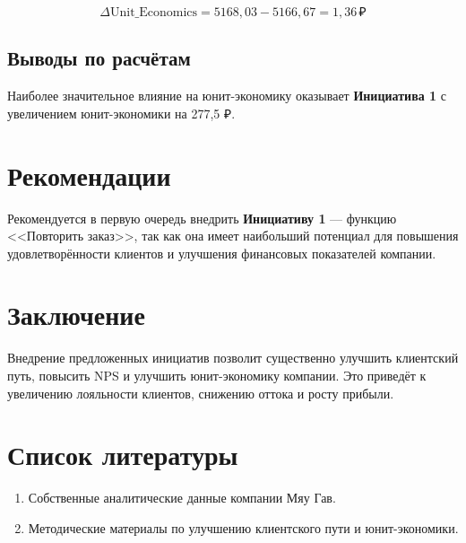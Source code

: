 \documentclass[a4paper,12pt]{article}
\begin{document}
\[
\Delta \text{Unit\_Economics} = 5168{,}03 - 5166{,}67 = 1{,}36 \, \text{₽}
\]

\subsection{Выводы по расчётам}

Наиболее значительное влияние на юнит-экономику оказывает \textbf{Инициатива 1} с увеличением юнит-экономики на 277{,}5 ₽.

\section{Рекомендации}

Рекомендуется в первую очередь внедрить \textbf{Инициативу 1} — функцию <<Повторить заказ>>, так как она имеет наибольший потенциал для повышения удовлетворённости клиентов и улучшения финансовых показателей компании.

\section*{Заключение}

Внедрение предложенных инициатив позволит существенно улучшить клиентский путь, повысить NPS и улучшить юнит-экономику компании. Это приведёт к увеличению лояльности клиентов, снижению оттока и росту прибыли.

\section*{Список литературы}

\begin{enumerate}
  \item Собственные аналитические данные компании Мяу Гав.
  \item Методические материалы по улучшению клиентского пути и юнит-экономики.
\end{enumerate}
\end{document}
